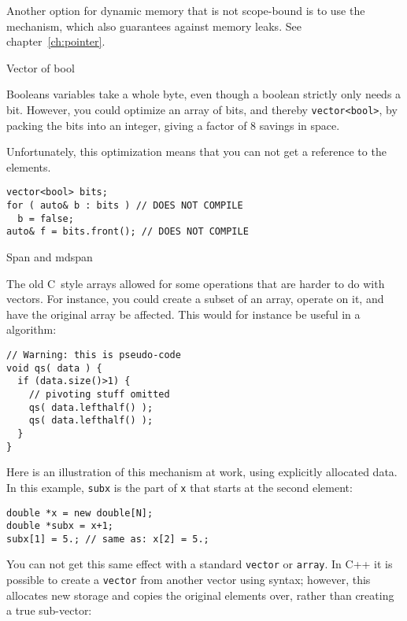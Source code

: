 Another option for dynamic memory that is not scope-bound
is to use the  mechanism,
which also guarantees against memory leaks. See chapter~\ref{ch:pointer}.

 {Vector of bool}

Booleans variables take a whole byte, even though
a boolean strictly only needs a bit.
However, you could optimize an array of bits,
and thereby \lstinline+vector<bool>+,
by packing the bits into an integer,
giving a factor of 8 savings in space.

Unfortunately, this optimization means that you can not
get a reference to the elements.
\begin{lstlisting}
vector<bool> bits;
for ( auto& b : bits ) // DOES NOT COMPILE
  b = false;
auto& f = bits.front(); // DOES NOT COMPILE
\end{lstlisting}

 {Span and mdspan}

\label{sec:gsl-span}

The old C~style arrays allowed for some operations that are harder to
do with vectors.
For instance, you could create a subset of an array,
operate on it,
and have the original array be affected.
This would for instance be useful in a  algorithm:
\begin{lstlisting}
// Warning: this is pseudo-code
void qs( data ) {
  if (data.size()>1) {
    // pivoting stuff omitted
    qs( data.lefthalf() );
    qs( data.lefthalf() );
  }
}
\end{lstlisting}

Here is an illustration of this mechanism at work,
using explicitly allocated data.
In this example, \lstinline{subx} is the part of \lstinline{x}
that starts at the second element:
\begin{lstlisting}
double *x = new double[N];
double *subx = x+1;
subx[1] = 5.; // same as: x[2] = 5.;
\end{lstlisting}

You can not get this same effect with a
standard \lstinline{vector} or \lstinline{array}.
In C++ it is possible to create a \lstinline{vector}
from another vector using  syntax;
however, this allocates new storage and copies the original elements over,
rather than creating a true sub-vector:



